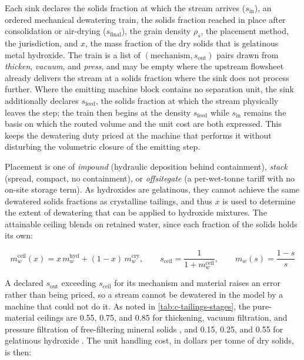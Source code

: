 \documentclass{article}
\renewcommand\_{\textunderscore\allowbreak}
\begin{document}
Each sink declares the solids fraction at which the stream arrives ($s_{\text{in}}$), an ordered mechanical dewatering train, the solids fraction reached in place after consolidation or air-drying ($s_{\text{final}}$), the grain density $\rho_s$, the placement method, the jurisdiction, and $x$, the mass fraction of the dry solids that is gelatinous metal hydroxide. The train is a list of $(\text{mechanism}, s_{\text{out}})$ pairs drawn from \textit{thicken}, \textit{vacuum}, and \textit{press}, and may be empty where the upstream flowsheet already delivers the stream at a solids fraction where the sink does not process further. Where the emitting machine block contains no separation unit, the sink additionally declares $s_{\text{feed}}$, the solids fraction at which the stream physically leaves the step; the train then begins at the density $s_{\text{feed}}$ while $s_{\text{in}}$ remains the basis on which the routed volume and the unit cost are both expressed. This keeps the dewatering duty priced at the machine that performs it without disturbing the volumetric closure of the emitting step.

Placement is one of \textit{impound} (hydraulic deposition behind containment), \textit{stack} (spread, compact, no containment), or \textit{offsite\_gate} (a per-wet-tonne tariff with no on-site storage term). As hydroxides are gelatinous, they cannot achieve the same dewatered solids fractions as crystalline tailings, and thus $x$ is used to determine the extent of dewatering that can be applied to hydroxide mixtures.  The attainable ceiling blends on retained water, since each fraction of the solids holds its own:

\begin{equation}
    m_w^{\text{ceil}}(x) = x\,m_w^{\text{hyd}} + (1-x)\,m_w^{\text{cry}},
    \qquad
    s_{\text{ceil}} = \frac{1}{1 + m_w^{\text{ceil}}},
    \qquad
    m_w(s) = \frac{1-s}{s}
    \label{eq:c-tailings-ceiling}
\end{equation}

\noindent A declared $s_{\text{out}}$ exceeding $s_{\text{ceil}}$ for its mechanism and material raises an error rather than being priced, so a stream cannot be dewatered in the model by a machine that could not do it. As noted in \ref{tab:c-tailings-stages}, the pure-material ceilings are 0.55, 0.75, and 0.85 for thickening, vacuum filtration, and pressure filtration of free-filtering mineral solids \cite{crystalFilterPressedDryStacking2018, klohncrippenbergerStudyTailingsManagement2017}, and 0.15, 0.25, and 0.55 for gelatinous hydroxide \cite{usepaBiosolidsTechnologyFact2000, usepaBiosolidsTechSheetPlatePress2000, usepaBiosolidsTechnologyFact2003}. The unit handling cost, in dollars per tonne of dry solids, is then:
\end{document}
